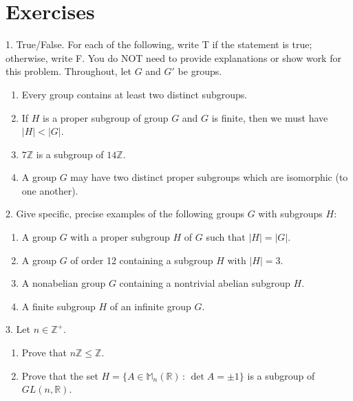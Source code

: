 \documentclass[10pt,openany,oneside]{book}
\theoremstyle{plain}
\theoremstyle{definition}
\theoremstyle{definition}
\theoremstyle{definition}
\theoremstyle{definition}
\numberwithin{equation}{section}
\def\Z{\mathbb{Z}}
\def\R{\mathbb{R}}
\def\M{\mathbb{M}}
\newcommand{\lt}{<}
\begin{document}
\section[{Exercises}]{Exercises}\label{exercises-5}
\begin{exerciselist}
\item[1.]\hypertarget{exercise-28}{}True/False. For each of the following, write T if the statement is true; otherwise, write F. You do NOT need to provide explanations or show work for this problem. Throughout, let \(G\) and \(G'\) be groups. \leavevmode%
\begin{enumerate}[label=(\alph*)]
\item\hypertarget{li-213}{}Every group contains at least two distinct subgroups.%
\item\hypertarget{li-214}{}If \(H\) is a proper subgroup of group \(G\) and \(G\) is finite, then we must have \(|H|\lt |G|\).%
\item\hypertarget{li-215}{}\(7\Z\) is a subgroup of \(14\Z\).%
\item\hypertarget{li-216}{}A group \(G\) may have two distinct proper subgroups which are isomorphic (to one another).%
\end{enumerate}
%
\par\smallskip
\item[2.]\hypertarget{exercise-29}{}Give specific, precise examples of the following groups \(G\) with subgroups \(H\): \leavevmode%
\begin{enumerate}[label=(\alph*)]
\item\hypertarget{li-221}{}A group \(G\) with a proper subgroup \(H\) of \(G\) such that \(|H|=|G|\).%
\item\hypertarget{li-222}{}A group \(G\) of order 12 containing a subgroup \(H\) with \(|H|=3\).%
\item\hypertarget{li-223}{}A nonabelian group \(G\) containing a nontrivial abelian subgroup \(H\).%
\item\hypertarget{li-224}{}A finite subgroup \(H\) of an infinite group \(G\).%
\end{enumerate}
%
\par\smallskip
\item[3.]\hypertarget{exercise-30}{}Let \(n\in \Z^+\). \leavevmode%
\begin{enumerate}[label=(\alph*)]
\item\hypertarget{li-229}{}Prove that \(n\Z \leq \Z\).%
\item\hypertarget{li-230}{}Prove that the set \(H=\{A\in \M_n(\R)\,:\,\det A=\pm 1\}\) is a subgroup of \(GL(n,\R)\).%

\end{enumerate}
\end{exerciselist}
\end{document}
